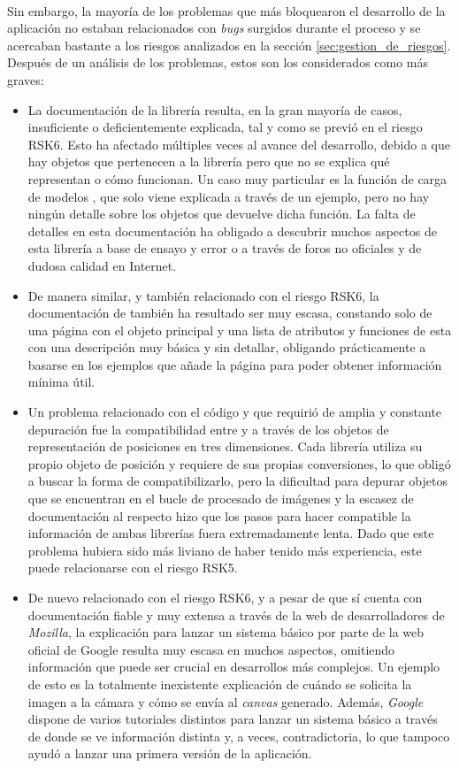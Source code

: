 \documentclass{subfiles}
\begin{document}
    \paragraph{}
    Sin embargo, la mayoría de los problemas que más bloquearon el desarrollo de la aplicación no estaban relacionados con \textit{bugs} surgidos durante el proceso y se acercaban bastante a los riesgos analizados en la sección \ref{sec:gestion_de_riesgos}. Después de un análisis de los problemas, estos son los considerados como más graves:
    \begin{itemize}
        \item La documentación de la librería \threejs resulta, en la gran mayoría de casos, insuficiente o deficientemente explicada, tal y como se previó en el riesgo RSK6. Esto ha afectado múltiples veces al avance del desarrollo, debido a que hay objetos que pertenecen a la librería pero que no se explica qué representan o cómo funcionan. Un caso muy particular es la función de carga de modelos \gltf, que solo viene explicada a través de un ejemplo, pero no hay ningún detalle sobre los objetos que devuelve dicha función. La falta de detalles en esta documentación ha obligado a descubrir muchos aspectos de esta librería a base de ensayo y error o a través de foros no oficiales y de dudosa calidad en Internet.
        \item De manera similar, y también relacionado con el riesgo RSK6, la documentación de \resonanceaudio también ha resultado ser muy escasa, constando solo de una página con el objeto principal y una lista de atributos y funciones de esta con una descripción muy básica y sin detallar, obligando prácticamente a basarse en los ejemplos que añade la página para poder obtener información mínima útil.
        \item Un problema relacionado con el código y que requirió de amplia y constante depuración fue la compatibilidad entre \threejs y \resonanceaudio a través de los objetos de representación de posiciones en tres dimensiones. Cada librería utiliza su propio objeto de posición y requiere de sus propias conversiones, lo que obligó a buscar la forma de compatibilizarlo, pero la dificultad para depurar objetos que se encuentran en el bucle de procesado de imágenes y la escasez de documentación al respecto hizo que los pasos para hacer compatible la información de ambas librerías fuera extremadamente lenta. Dado que este problema hubiera sido más liviano de haber tenido más experiencia, este puede relacionarse con el riesgo RSK5.
        \item De nuevo relacionado con el riesgo RSK6, y a pesar de que \webxr sí cuenta con documentación fiable y muy extensa a través de la web de desarrolladores de \textit{Mozilla}, la explicación para lanzar un sistema básico por parte de la web oficial de Google resulta muy escasa en muchos aspectos, omitiendo información que puede ser crucial en desarrollos más complejos. Un ejemplo de esto es la totalmente inexistente explicación de cuándo se solicita la imagen a la cámara y cómo se envía al \textit{canvas} generado. Además, \textit{Google} dispone de varios tutoriales distintos para lanzar un sistema básico a través de \webxr donde se ve información distinta y, a veces, contradictoria, lo que tampoco ayudó a lanzar una primera versión de la aplicación.

\end{itemize}
\end{document}
